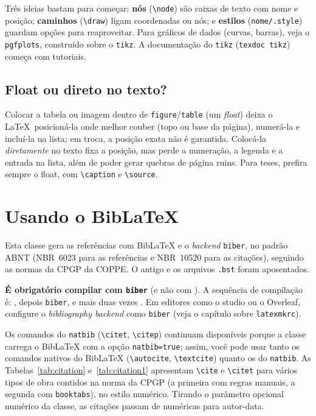 \documentclass[dsc,setavermelha]{ufrj}
\theoremstyle{plain}
\theoremstyle{definition}
\theoremstyle{remark}
\begin{document}
Três ideias bastam para começar: \textbf{nós} (\verb|\node|) são caixas de texto com nome e posição; \textbf{caminhos} (\verb|\draw|) ligam coordenadas ou nós; e \textbf{estilos} (\verb|nome/.style|) guardam opções para reaproveitar. Para gráficos de dados (curvas, barras), veja o \verb|pgfplots|, construído sobre o \verb|tikz|. A documentação do \verb|tikz| (\texttt{texdoc tikz}) começa com tutoriais.

\section{Float ou direto no texto?}

Colocar a tabela ou imagem dentro de \verb|figure|/\verb|table| (um \emph{float}) deixa o \LaTeX\ posicioná-la onde melhor couber (topo ou base da página), numerá-la e incluí-la na lista; em troca, a posição exata não é garantida. Colocá-la \emph{diretamente} no texto fixa a posição, mas perde a numeração, a legenda e a entrada na lista, além de poder gerar quebras de página ruins. Para teses, prefira sempre o float, com \verb|\caption| e \verb|\source|.

  \chapter{Usando o BibLaTeX}
  \label{cap:biblatex}

  Esta classe gera as referências com BibLaTeX e o \emph{backend} \texttt{biber}, no padrão ABNT (NBR~6023 para as referências e NBR~10520 para as citações), seguindo as normas da CPGP da COPPE. O antigo  e os arquivos \texttt{.bst} foram aposentados.

  \textbf{É obrigatório compilar com \texttt{biber}} (e não com ). A sequência de compilação é: , depois \texttt{biber}, e mais duas vezes . Em editores como o studio ou o Overleaf, configure o \emph{bibliography backend} como \texttt{biber} (veja o capítulo sobre \texttt{latexmkrc}).

  Os comandos do \texttt{natbib} (\verb|\citet|, \verb|\citep|) continuam disponíveis porque a classe carrega o BibLaTeX com a opção \texttt{natbib=true}; assim, você pode usar tanto os comandos nativos do BibLaTeX (\verb|\autocite|, \verb|\textcite|) quanto os do \texttt{natbib}. As Tabelas~\ref{tab:citation} e~\ref{tab:citation1} apresentam \verb|\cite| e \verb|\citet| para vários tipos de obra contidos na norma da CPGP (a primeira com regras manuais, a segunda com \texttt{booktabs}), no estilo numérico. Tirando o parâmetro opcional numérico da classe, as citações passam de numéricas para autor-data.
\end{document}
